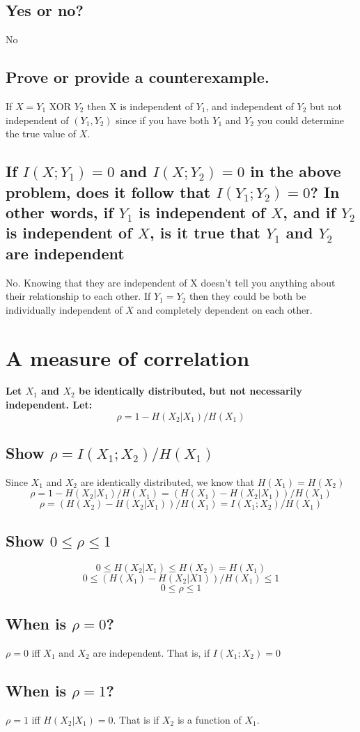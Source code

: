 \documentclass[11pt, oneside]{book}   	%
\begin{document}
\subsection{Yes or no?}
No
\subsection{Prove or provide a counterexample.}
If $X=Y_1$ XOR $Y_2$ then X is independent of $Y_1$, and independent of $Y_2$ but not independent of $(Y_1,Y_2)$ since if you have both $Y_1$ and $Y_2$ you could determine the true value of $X$.
\subsection{If $I(X; Y_1)=0$ and $I(X; Y_2)=0$ in the above problem, does it follow that $I(Y_1;Y_2)=0$?  In other words, if $Y_1$ is independent of $X$, and if $Y_2$ is independent of $X$, is it true that $Y_1$ and $Y_2$ are independent}
No.  Knowing that they are independent of X doesn't tell you anything about their relationship to each other.  If $Y_1 = Y_2$ then they could be both be individually independent of $X$ and completely dependent on each other.

\section{A measure of correlation}
\textbf{Let $X_1$ and $X_2$ be identically distributed, but not necessarily independent.  Let: $$\rho = 1-H(X_2|X_1)/H(X_1)$$}
\subsection{Show $\rho = I(X_1;X_2)/H(X_1)$}
Since $X_1$ and $X_2$ are identically distributed, we know that $H(X_1)=H(X_2)$
$$\rho = 1-H(X_2|X_1)/H(X_1) = (H(X_1)-H(X_2|X_1))/H(X_1)$$
$$\rho = (H(X_2)-H(X_2|X_1))/H(X_1)=I(X_1;X_2)/H(X_1)$$
\subsection{Show $0 \leq \rho \leq 1$}
$$0 \leq H(X_2|X_1) \leq H(X_2) = H(X_1)$$
$$0 \leq (H(X_1)-H(X_2|X1))/H(X_1) \leq 1$$
$$0 \leq \rho \leq 1$$
\subsection{When is $\rho=0$?}
$\rho=0$ iff $X_1$ and $X_2$ are independent.  That is, if $I(X_1;X_2)=0$
\subsection{When is $\rho=1$?}
$\rho =1$ iff $H(X_2|X_1)=0$.  That is if $X_2$ is a function of $X_1$.
\end{document}
